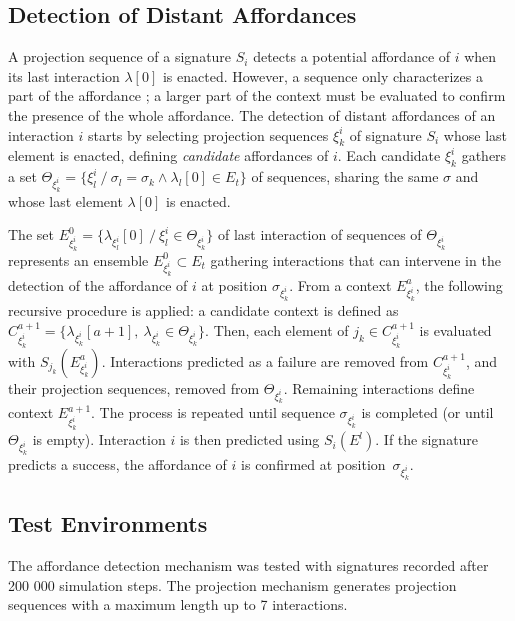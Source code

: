\documentclass[conference]{IEEEtran}
\begin{document}
\subsection{Detection of Distant Affordances}\label{detection}


A projection sequence of a signature $S_i$ detects a potential affordance of $i$ when its last interaction $\lambda[0]$ is enacted.
However, a sequence only characterizes a part of the affordance ; a larger part of the context must be evaluated to confirm the presence of the whole affordance.
The detection of distant affordances of an interaction $i$ starts by selecting projection sequences $\xi_k^i$ of signature $S_i$ whose last element is enacted, defining \textit{candidate} affordances of $i$. Each candidate $\xi_k^i$ gathers a set $\Theta_{\xi_k^i} = \{\xi_l^i ~/~ \sigma_l = \sigma_k \wedge \lambda_l[0] \in E_t\}$ of sequences, sharing the same $\sigma$ and whose last element $\lambda[0]$ is enacted.

The set $E_{\xi_k^i}^0=\{\lambda_{\xi_l^i}[0] ~/~\xi_l^i \in \Theta_{\xi_k^i}\}$ of last interaction of sequences of $\Theta_{\xi_k^i}$ represents an ensemble $E_{\xi_k^i}^0 \subset E_t$ gathering interactions that can intervene in the detection of the affordance of $i$ at position $\sigma_{\xi_k^i}$.
From a context $E_{\xi_k^i}^a$, the following recursive procedure is applied: a candidate context is defined as $C_{\xi_k^i}^{a+1} = \{\lambda_{\xi_k^i}[a+1] ,~ \lambda_{\xi_k^i} \in \Theta_{\xi_k^i} \} $. Then, each element of $j_k \in C_{\xi_k^i}^{a+1}$ is evaluated with $S_{j_k}(E_{\xi_k^i}^a)$. Interactions predicted as a failure are removed from $C_{\xi_k^i}^{a+1}$, and their projection sequences, removed from $\Theta_{\xi_k^i}$. Remaining interactions define context $E_{\xi_k^i}^{a+1}$. The process is repeated until sequence $\sigma_{\xi_k^i}$ is completed (or until $\Theta_{\xi_k^i}$ is empty). Interaction $i$ is then predicted using $S_i(E^l)$. If the signature predicts a success, the affordance of $i$ is confirmed at position~$\sigma_{\xi_k^i}$.


\subsection{Test Environments}\label{test}

The affordance detection mechanism was tested with signatures recorded after 200 000 simulation steps.
The projection mechanism generates projection sequences with a maximum length up to 7 interactions.
\end{document}
